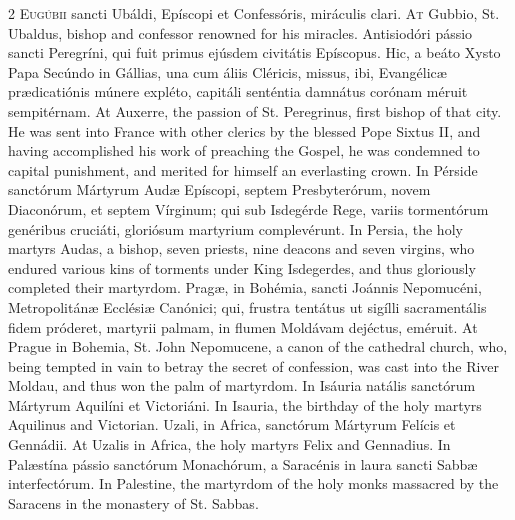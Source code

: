 \begin{paracol}{2}
\lettrine[lines=2]{E}{ugúbii} sancti Ubáldi, 
 Epíscopi et Confessóris, miráculis clari.
\switchcolumn
{}
\lettrine[lines=2]{A}{t} Gubbio, St. Ubaldus, bishop and 
 confessor renowned for his miracles.
\switchcolumn*
{}
Antisiodóri pássio 
 sancti Peregríni, qui fuit primus ejúsdem civitátis Epíscopus. Hic, a 
 beáto Xysto Papa Secúndo in Gállias, una cum áliis Cléricis, missus, ibi, 
 Evangélicæ prædicatiónis múnere expléto, capitáli senténtia damnátus corónam 
 méruit sempitérnam.
\switchcolumn
{}
At Auxerre, the passion of St. 
 Peregrinus, first bishop of that city. He was sent into France with 
 other clerics by the blessed Pope Sixtus II, and having accomplished his 
 work of preaching the Gospel, he was condemned to capital punishment, and 
 merited for himself an everlasting crown.
\switchcolumn*
{}
In Pérside sanctórum 
 Mártyrum Audæ Epíscopi, septem Presbyterórum, novem Diaconórum, et septem 
 Vírginum; qui sub Isdegérde Rege, variis tormentórum genéribus cruciáti, 
 gloriósum martyrium complevérunt.
\switchcolumn
{}
In Persia, the holy martyrs Audas, 
 a bishop, seven priests, nine deacons and seven virgins, who endured various 
 kins of torments under King Isdegerdes, and thus gloriously completed their 
 martyrdom.
\switchcolumn*
{}
Pragæ, in Bohémia, sancti Joánnis Nepomucéni, Metropolitánæ Ecclésiæ Canónici; qui, frustra 
 tentátus ut sigílli sacramentális fidem próderet, martyrii palmam, in flumen 
 Moldávam dejéctus, eméruit.
\switchcolumn
{}
At Prague in Bohemia, St. John 
 Nepomucene, a canon of the cathedral church, who, being tempted in vain to 
 betray the secret of confession, was cast into the River Moldau, and thus 
 won the palm of martyrdom.
\switchcolumn*
{}
In Isáuria natális 
 sanctórum Mártyrum Aquilíni et Victoriáni.
\switchcolumn
{}
In Isauria, the birthday of the 
 holy martyrs Aquilinus and Victorian.
\switchcolumn*
{}
Uzali, in Africa, 
 sanctórum Mártyrum Felícis et Gennádii.
\switchcolumn
{}
At Uzalis in Africa, the holy 
 martyrs Felix and Gennadius.
\switchcolumn*
{}
In Palæstína pássio 
 sanctórum Monachórum, a Saracénis in laura sancti Sabbæ interfectórum.
\switchcolumn
{}
In Palestine, the martyrdom of the 
 holy monks massacred by the Saracens in the monastery of St. Sabbas.

\end{paracol}
